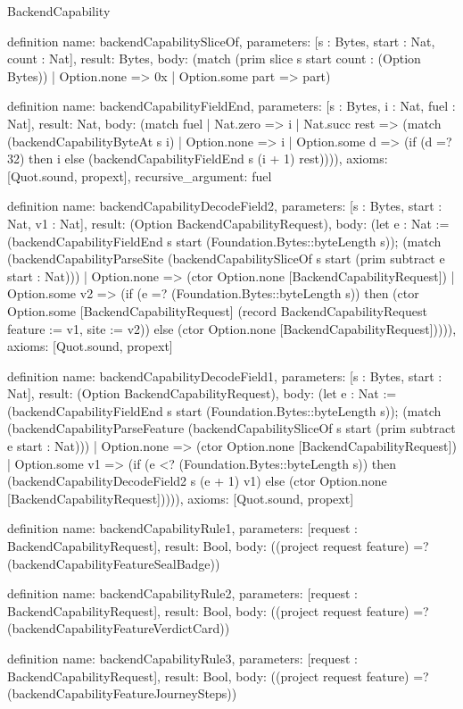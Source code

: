 \begin{lexlean}{BackendCapability}
\begin{semanticmodule}
definition{
  name: backendCapabilitySliceOf,
  parameters: [s : Bytes, start : Nat, count : Nat],
  result: Bytes,
  body: (match (prim slice s start count : (Option Bytes))
    | Option.none => 0x
    | Option.some part => part)
}

definition{
  name: backendCapabilityFieldEnd,
  parameters: [s : Bytes, i : Nat, fuel : Nat],
  result: Nat,
  body: (match fuel
    | Nat.zero => i
    | Nat.succ rest => (match (backendCapabilityByteAt s i)
      | Option.none => i
      | Option.some d => (if (d =? 32) then i else (backendCapabilityFieldEnd s (i + 1) rest)))),
  axioms: [Quot.sound, propext],
  recursive_argument: fuel
}

definition{
  name: backendCapabilityDecodeField2,
  parameters: [s : Bytes, start : Nat, v1 : Nat],
  result: (Option BackendCapabilityRequest),
  body: (let e : Nat := (backendCapabilityFieldEnd s start (Foundation.Bytes::byteLength s)); (match (backendCapabilityParseSite (backendCapabilitySliceOf s start (prim subtract e start : Nat)))
    | Option.none => (ctor Option.none [BackendCapabilityRequest])
    | Option.some v2 => (if (e =? (Foundation.Bytes::byteLength s)) then (ctor Option.some [BackendCapabilityRequest] (record BackendCapabilityRequest {feature := v1, site := v2})) else (ctor Option.none [BackendCapabilityRequest])))),
  axioms: [Quot.sound, propext]
}

definition{
  name: backendCapabilityDecodeField1,
  parameters: [s : Bytes, start : Nat],
  result: (Option BackendCapabilityRequest),
  body: (let e : Nat := (backendCapabilityFieldEnd s start (Foundation.Bytes::byteLength s)); (match (backendCapabilityParseFeature (backendCapabilitySliceOf s start (prim subtract e start : Nat)))
    | Option.none => (ctor Option.none [BackendCapabilityRequest])
    | Option.some v1 => (if (e <? (Foundation.Bytes::byteLength s)) then (backendCapabilityDecodeField2 s (e + 1) v1) else (ctor Option.none [BackendCapabilityRequest])))),
  axioms: [Quot.sound, propext]
}

definition{
  name: backendCapabilityRule1,
  parameters: [request : BackendCapabilityRequest],
  result: Bool,
  body: ((project request feature) =? (backendCapabilityFeatureSealBadge))
}

definition{
  name: backendCapabilityRule2,
  parameters: [request : BackendCapabilityRequest],
  result: Bool,
  body: ((project request feature) =? (backendCapabilityFeatureVerdictCard))
}

definition{
  name: backendCapabilityRule3,
  parameters: [request : BackendCapabilityRequest],
  result: Bool,
  body: ((project request feature) =? (backendCapabilityFeatureJourneySteps))
}


\end{semanticmodule}
\end{lexlean}
